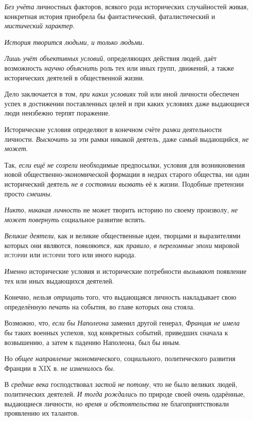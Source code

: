 \documentclass[a4paper,14pt,russian]{extreport}
\begin{document}
\emph{Без учёта} личностных факторов, всякого рода исторических случайностей живая, конкретная история приобрела бы фантастический, фаталистический и \emph{мистический характер}.

\emph{История творится людьми, и только людьми.}

\emph{Лишь учёт объективных условий}\textsc{,} определяющих действия людей, даёт возможность \emph{научно объяснить} роль тех или иных групп, движений, а также исторических деятелей в общественной жизни.

Дело заключается в том, \emph{при каких условиях} той или иной личности обеспечен успех в достижении поставленных целей и при каких условиях даже выдающиеся люди неизбежно терпят поражение.

Исторические условия определяют в конечном счёте \emph{рамки} деятельности личности. \emph{Выскочить} за эти рамки никакой деятель, даже самый выдающийся, \emph{не может}.

Так, \emph{если ещё не созрели} необходимые предпосылки, условия для возникновения новой общественно-экономической формации в недрах старого общества, ни один исторический деятель \emph{не в состоянии вызвать} её к жизни. Подобные претензии просто \emph{смешны}.

\emph{Никто}, \emph{никакая личность} не может творить историю по своему произволу, \emph{не может повернуть} социальное развитие вспять.

\emph{Великие деятели}, как и великие общественные идеи, творцами и выразителями которых они являются, \emph{появляются, как правило, в переломные эпохи} мировой \textsc{истории} или \textsc{истории} того или иного народа.

\emph{Именно} исторические условия и исторические потребности \emph{вызывают} появление тех или иных выдающихся деятелей.

Конечно, \emph{нельзя отрицать} того, что выдающаяся личность накладывает свою определённую \emph{печать} на события, во главе которых она стояла.

Возможно, что, \emph{если бы Наполеона} заменил другой генерал, \emph{Франция не имела бы} таких военных успехов, ход конкретных событий, приведших сначала к возвышению, а затем к падению Наполеона, был бы иным.

Но \emph{общее направление} экономического, социального, политического развития Франции в XIX в. \emph{не изменилось бы}.

В \emph{средние века} господствовал \emph{застой} \emph{не потому}, что не было великих людей, политических деятелей. \emph{И тогда рождались} по природе своей очень одарённые, выдающиеся личности, \emph{но время и обстоятельства} не благоприятствовали проявлению их талантов.
\end{document}
